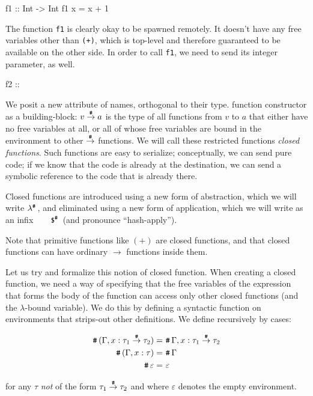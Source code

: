 \documentclass[preprint]{sigplanconf}
\begin{document}
\begin{code}
f1 :: Int -> Int
f1 x = x + 1
\end{code}

The function \texttt{f1} is clearly okay to be spawned remotely. It doesn't have any free variables other than \lstinline!(+)!, which is top-level and therefore guaranteed to be available on the other side. In order to call \texttt{f1}, we need to send its integer parameter, as well.

\begin{code}
f2 :: 
\end{code}

We posit a new attribute of names, orthogonal to their type. function constructor as a building-block: $v \stackrel{\texttt{\#}}{\rightarrow} a$ is the type of all functions from $v$ to $a$ that either have no free variables at all, or all of whose free variables are bound in the environment to other $\stackrel{\texttt{\#}}{\rightarrow}$ functions. We will call these restricted functions {\em closed functions}. Such functions are easy to serialize; conceptually, we can send pure code; if we know that the code is already at the destination, we can send a symbolic reference to the code that is already there.  

Closed functions are introduced using a new form of abstraction, which we will write $\lambda^{\texttt{\#}}\,$, and eliminated using a new form of application, which we will write as an infix $\napp$ (and pronounce ``hash-apply'').

Note that primitive functions like $(+)$ are closed functions, and that closed functions can have ordinary $\rightarrow$ functions inside them.  

Let us try and formalize this notion of closed function.  
When creating a closed function, we need a way of specifying that the free variables of the expression that forms the body of the function can access only other closed functions (and the $\lambda$-bound variable).  We do this by defining a syntactic function \closed{} on environments that strips-out other definitions.  We define \closed{} recursively by cases:

\begin{align*}
	\texttt{\#}\,(\Gamma , x: \tau_1 \stackrel{\texttt{\#}}{\rightarrow} \tau_2) 		=& ~ \texttt{\#}\,\Gamma , x: \tau_1 \stackrel{\texttt{\#}}{\rightarrow} \tau_2 \\
	\texttt{\#}\,(\Gamma , x: \tau)						=& ~ \texttt{\#}\,\Gamma   \\
	\texttt{\#}\,\varepsilon 								=& ~ \varepsilon 
\end{align*}

for any $\tau$ \emph{not} of the form $\tau_1 \stackrel{\texttt{\#}}{\rightarrow}{} \tau_2$ and
where $\varepsilon$ denotes the empty environment.
\end{document}
